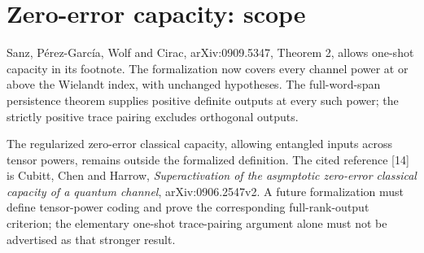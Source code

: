 \section{Zero-error capacity: scope}
Sanz, Pérez-García, Wolf and Cirac, arXiv:0909.5347,
Theorem 2, allows one-shot capacity in its footnote. The formalization
now covers every channel power at or above the Wielandt index, with
unchanged hypotheses. The full-word-span persistence theorem supplies
positive definite outputs at every such power; the strictly positive
trace pairing excludes orthogonal outputs.

The regularized zero-error classical capacity, allowing entangled inputs
across tensor powers, remains outside the formalized definition.
The cited reference [14] is Cubitt, Chen and Harrow,
\emph{Superactivation of the asymptotic zero-error classical capacity
of a quantum channel}, arXiv:0906.2547v2. A future formalization must
define tensor-power coding and prove the corresponding full-rank-output
criterion; the elementary one-shot trace-pairing argument alone must not
be advertised as that stronger result.
